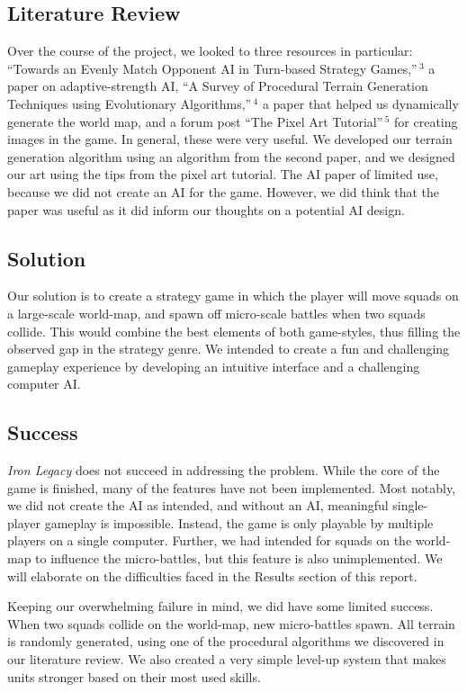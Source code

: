 \documentclass{article}
\begin{document}
\subsection*{Literature Review}
Over the course of the project, we looked to three resources in particular:
``Towards an Evenly Match Opponent AI in Turn-based Strategy Games,''$\,^3$
a paper on adaptive-strength AI, 
``A Survey of Procedural Terrain Generation Techniques using Evolutionary 
Algorithms,''$\,^4$ a paper that helped us dynamically
generate the world map, and a forum post ``The Pixel Art 
Tutorial''$\,^5$ for creating images in the game.
In general, these were very useful.
We developed our terrain generation algorithm using an algorithm from the 
second paper, and we designed our art using the tips from the pixel art
tutorial.
The AI paper of limited use, because we did not create an AI for
the game. However, we did think that the paper was useful
as it did inform our thoughts on a potential AI design.

\subsection*{Solution}
Our solution is to create a strategy game in which the player will move squads
on a large-scale world-map, and spawn off micro-scale battles when two squads
collide.
This would combine the best elements of both game-styles,
thus filling the observed gap in the strategy genre.
We intended to create a fun and challenging gameplay experience by developing
an intuitive interface and a challenging computer AI.

\subsection*{Success}
\emph{Iron Legacy} does not succeed in addressing the problem.
While the core of the game is finished, many of the features have not been
implemented.
Most notably, we did not create the AI as intended,
and without an AI, meaningful single-player gameplay is impossible.
Instead, the game is only playable by multiple players on a single computer.
Further, we had intended for squads on the world-map to influence
the micro-battles, but this feature is also unimplemented.
We will elaborate on the difficulties faced in the Results section of this
report.

Keeping our overwhelming failure in mind, we did have some limited success.
When two squads collide on the world-map, new micro-battles spawn.
All terrain is randomly generated, using one of the procedural algorithms
we discovered in our literature review.
We also created a very simple level-up system that makes units stronger
based on their most used skills.
\end{document}
